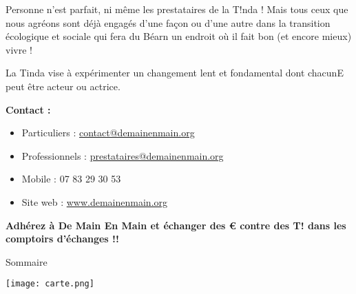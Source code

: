 \noindent Personne n’est parfait, ni même les prestataires de la T!nda ! Mais tous ceux que nous agréons sont déjà engagés
d’une façon ou d’une autre dans la transition écologique et sociale qui fera du Béarn un endroit où il fait bon (et
encore mieux) vivre !
    \vspace{.2cm}

\noindent La Tinda vise à expérimenter un changement lent et fondamental dont chacunE peut être acteur ou actrice.

    \vspace{1cm}

      \textbf{Contact :}
    \begin{itemize}
      \item[] Particuliers : \href{mailto:contact@demainenmain.org}{contact@demainenmain.org}
      \item[] Professionnels : \href{mailto:prestataires@demainenmain.org}{prestataires@demainenmain.org}
      \item[] Mobile : 07 83 29 30 53 
      \item[] Site web : \href{https://www.demainenmain.org}{www.demainenmain.org}
    \end{itemize}

    \vspace{1cm}

  \begin{center}
    {\Large \textbf{Adhérez à De Main En Main et échanger des € contre des T! dans les comptoirs d’échanges !!}}
    \vspace{1cm}

    \hypersetup{hidelinks}
    {\Huge {}}


  \end{center}

  \pagebreak

  \begin{center}
    \vspace*{2cm}
    
    {\Huge \centering Sommaire}

    \parbox[c]{13cm}{ {\Large\tableofcontents}
    }
  \end{center}

\pagebreak

  \begin{center}
    \texttt{[image: carte.png]}
  \end{center}

\pagebreak
